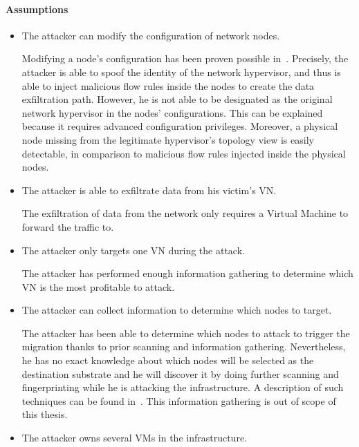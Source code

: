 \paragraph{Assumptions}
\begin{itemize}
    \item The attacker can modify the configuration of network nodes.
    
    Modifying a node's configuration has been proven  possible in~\cite{Taxonomy_Hizver2015, Bokani2015, attain-Ujcich2017}. Precisely, the attacker is able to spoof the identity of the network hypervisor, and thus is able to inject malicious flow rules inside the nodes to create the data exfiltration path. 
    However, he is not able to be designated as the original network hypervisor in the nodes' configurations. 
    This can be explained because it requires advanced configuration privileges. Moreover, a physical node missing from the legitimate hypervisor's topology view is easily detectable, in comparison to malicious flow rules injected inside the physical nodes.
    
    \item The attacker is able to exfiltrate data from his victim's VN.
    
    The exfiltration of data from the network only requires a Virtual Machine to forward the traffic to.
    
    \item The attacker only targets one VN during the attack.
    
     The attacker has performed enough information gathering to determine which VN is the most profitable to attack.
     
    
    \item The attacker can collect information to determine which nodes to target.
    
    The attacker has been able to determine which nodes to attack to trigger the migration thanks to prior scanning and information gathering. 
    Nevertheless, he has no exact knowledge about which nodes will be selected as the destination substrate and he will discover it by doing further scanning and fingerprinting  while he is attacking the infrastructure.  
    A description of such techniques can be found in~\cite{Hong2015,Sphinx-Dhawan2015}.
    This information gathering is out of scope of this thesis.
    
    \item The attacker owns several VMs in the infrastructure.
    

\end{itemize}
